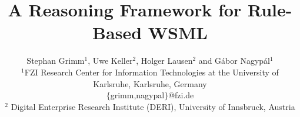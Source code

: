 \documentclass[times, 10pt,twocolumn]{article}
\begin{document}


\title{A Reasoning Framework for Rule-Based WSML}

\author{Stephan Grimm$^1$, Uwe Keller$^2$, Holger Lausen$^2$ and G\'abor Nagyp\'al$^1$\\
\normalsize $^1$FZI Research Center for Information
Technologies at the University of Karlsruhe, Karlsruhe, Germany\\
\normalsize \sf $\{$grimm,nagypal$\}$@fzi.de\\[1mm]
\normalsize $^2$ Digital Enterprise Research Institute (DERI),
 University of Innsbruck, Austria\\ \normalsize {} }

\maketitle

\begin{abstract}

\end{abstract}











\end{document}
